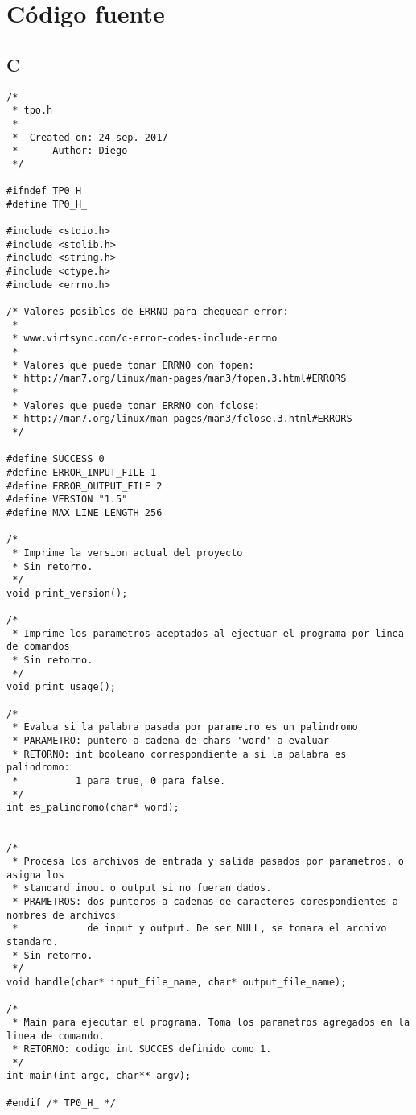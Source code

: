 \documentclass[10pt,a4paper]{article}
\begin{document}
\newpage

\section{Código fuente}

\subsection{C}

\lstset{
	breaklines=true,
  	basicstyle=\footnotesize,
	numbers=left,
	captionpos=b,
	showspaces=false,
	title=\lstname
}

\begin{lstlisting}
/*
 * tpo.h
 *
 *  Created on: 24 sep. 2017
 *      Author: Diego
 */

#ifndef TP0_H_
#define TP0_H_

#include <stdio.h>
#include <stdlib.h>
#include <string.h>
#include <ctype.h>
#include <errno.h>

/* Valores posibles de ERRNO para chequear error:
 *
 * www.virtsync.com/c-error-codes-include-errno
 *
 * Valores que puede tomar ERRNO con fopen:
 * http://man7.org/linux/man-pages/man3/fopen.3.html#ERRORS
 *
 * Valores que puede tomar ERRNO con fclose:
 * http://man7.org/linux/man-pages/man3/fclose.3.html#ERRORS
 */

#define SUCCESS 0
#define ERROR_INPUT_FILE 1
#define ERROR_OUTPUT_FILE 2
#define VERSION "1.5"
#define MAX_LINE_LENGTH 256

/*
 * Imprime la version actual del proyecto
 * Sin retorno.
 */
void print_version();

/*
 * Imprime los parametros aceptados al ejectuar el programa por linea de comandos
 * Sin retorno.
 */
void print_usage();

/*
 * Evalua si la palabra pasada por parametro es un palindromo
 * PARAMETRO: puntero a cadena de chars 'word' a evaluar
 * RETORNO: int booleano correspondiente a si la palabra es palindromo:
 * 			1 para true, 0 para false.
 */
int es_palindromo(char* word);


/*
 * Procesa los archivos de entrada y salida pasados por parametros, o asigna los
 * standard inout o output si no fueran dados.
 * PRAMETROS: dos punteros a cadenas de caracteres corespondientes a nombres de archivos
 * 			  de input y output. De ser NULL, se tomara el archivo standard.
 * Sin retorno.
 */
void handle(char* input_file_name, char* output_file_name);

/*
 * Main para ejecutar el programa. Toma los parametros agregados en la linea de comando.
 * RETORNO: codigo int SUCCES definido como 1.
 */
int main(int argc, char** argv);

#endif /* TP0_H_ */
\end{lstlisting}
\end{document}
